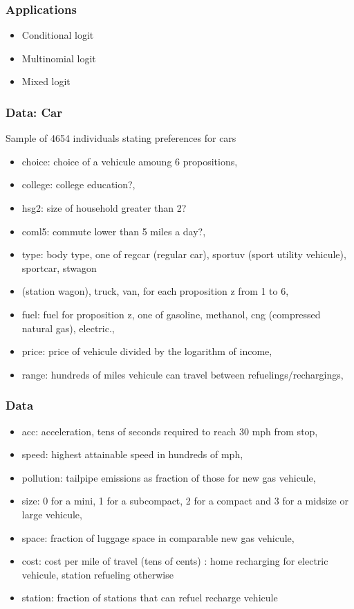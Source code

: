 \documentclass{beamer}
\newcommand{\1}{\mathbb{1}}
\begin{document}
\begin{frame}\frametitle{Applications}
\begin{itemize}
 \item Conditional logit
 \item Multinomial logit
 \item Mixed logit
\end{itemize}
\end{frame}

\begin{frame}\frametitle{Data: Car}
Sample of 4654 individuals stating preferences for cars
\begin{itemize}
 \item choice: choice of a vehicule amoung 6 propositions,
 \item college: college education?,
\item hsg2: size of household greater than 2?
\item coml5: commute lower than 5 miles a day?,
\item type: body type, one of regcar (regular car), sportuv (sport utility vehicule), sportcar, stwagon
\item (station wagon), truck, van, for each proposition z from 1 to 6,
\item fuel: fuel for proposition z, one of gasoline, methanol, cng (compressed natural gas), electric.,
\item price: price of vehicule divided by the logarithm of income,
\item range: hundreds of miles vehicule can travel between refuelings/rechargings,
\end{itemize}
\end{frame}

\begin{frame}\frametitle{Data}
\begin{itemize}
\item acc: acceleration, tens of seconds required to reach 30 mph from stop,
\item speed: highest attainable speed in hundreds of mph,
\item pollution: tailpipe emissions as fraction of those for new gas vehicule,
\item size: 0 for a mini, 1 for a subcompact, 2 for a compact and 3 for a midsize or large vehicule,
\item space: fraction of luggage space in comparable new gas vehicule,
\item cost: cost per mile of travel (tens of cents) : home recharging for electric vehicule, station
refueling otherwise
\item station: fraction of stations that can refuel recharge vehicule
\end{itemize}
\end{frame}
\end{document}
